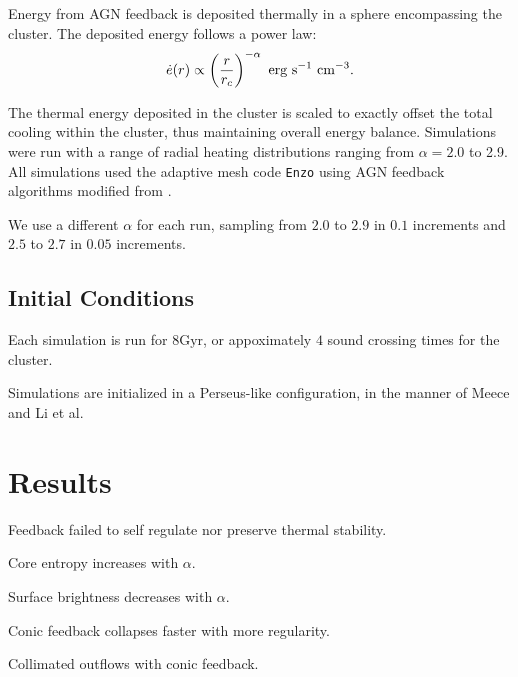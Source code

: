\documentclass[iop,apjl, twocolappendix]{emulateapj}   %
\begin{document}
Energy from AGN feedback is deposited thermally in a sphere encompassing the
cluster. The deposited energy follows a power law:
\vspace{-0.5em}
\begin{equation}
	\dot{e}(r) \propto \left( \frac{r}{r_c} \right )^{-\alpha} \text{ erg} \text{ s}^{-1} \text{ cm}^{-3}.
	\vspace{-0.5em}
\end{equation}

\noindent
The thermal energy deposited in the cluster is scaled to exactly offset the
total cooling within the cluster, thus maintaining overall energy balance.
Simulations were run with a range of radial heating distributions ranging from
$\alpha = 2.0$ to 2.9. 
All simulations used the adaptive mesh code \texttt{Enzo}
\cite{bryan_enzo_2014-1} using AGN feedback algorithms modified from
\cite{meece_jr_agn_2016,meece_triggering_2017}.


We use a different $\alpha$ for each run, sampling from $2.0$ to
$2.9$ in $0.1$ increments and $2.5$ to $2.7$ in $0.05$ increments.

\subsection{Initial Conditions}
\label{sec:initial_conditions}
\textbullet Each simulation is run for $8 \text{Gyr}$, or appoximately $4$ sound crossing
times for the cluster. 

Simulations are initialized in a Perseus-like configuration, in the manner
of Meece \cite{meece_triggering_2017} and Li et al.\ \cite{li_cooling_2015} 

\section{Results}

\textbullet Feedback failed to self regulate nor preserve thermal stability.

\textbullet Core entropy increases with $\alpha$.

\textbullet Surface brightness decreases with $\alpha$.

\textbullet Conic feedback collapses faster with more regularity.

\textbullet Collimated outflows with conic feedback.
\end{document}
